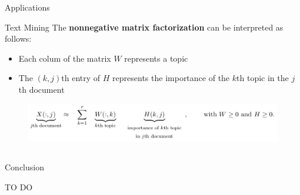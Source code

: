 \documentclass[final]{beamer}
\newlength{\twocolwid}
\newlength{\threecolwid}
\begin{document}
\begin{frame}
\begin{columns}[t]
\begin{column}{\threecolwid}
\begin{columns}[t]
\begin{column}{\twocolwid}
\begin{exampleblock}{Applications}
\begin{block}{Text Mining}
The \textbf{nonnegative matrix factorization} can be interpreted as follows:\\
\begin{itemize}
    \item Each colum of the matrix $W$ represents a topic
    \item The $(k,j)$th entry of $H$ represents the importance of the $k$th topic in the $j$th document
\end{itemize}
\begin{figure}
    \centering
    \includegraphics{presentation/NMF_app2.png}
\end{figure}
\end{block}

\end{exampleblock}

\end{column} %

\end{columns}

\begin{alertblock}{Conclusion}

TO DO

\end{alertblock}



\end{column}
\end{columns}
\end{frame}
\end{document}
